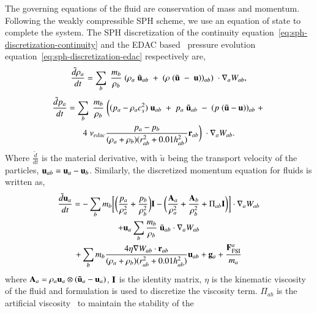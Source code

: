 The governing equations of the fluid are conservation of mass and momentum.
Following the weakly compressible SPH scheme, we use an equation of state to
complete the system. The SPH discretization of the continuity
equation~\eqref{eq:sph-discretization-continuity} and the EDAC
based~ pressure evolution
equation~\eqref{eq:sph-discretization-edac} respectively are,
\begin{equation}
  \label{eq:sph-discretization-continuity}
  \frac{\tilde{d}\rho_a}{dt} = \sum_{b} \; \frac{m_b}{\rho_{b}} \; (
  \rho_{a} \; \tilde{\mathbf{u}}_{ab} \; + \;
  (\rho \; (\tilde{\mathbf{u}} \; - \;
  \mathbf{u}))_{ab}) \; \cdot \nabla_{a} W_{ab},
\end{equation}
\begin{multline}
  \label{eq:sph-discretization-edac}
  \frac{\tilde{d}p_a}{dt} = \sum_{b} \; \frac{m_b}{\rho_{b}} \; \bigg(
  (p_{a} - \rho_{a} c_{s}^2) \; \mathbf{u}_{ab} \; + \;
  p_{a} \; \tilde{\mathbf{u}}_{ab} \; - \;
  (p \; (\tilde{\mathbf{u}} - \mathbf{u}))_{ab} \; + \; \\
  4 \; \nu_{edac}
  \frac{p_a - p_b}{(\rho_a + \rho_b) (r^2_{ab} + 0.01 h_{ab}^{2})} \mathbf{r}_{ab}
  \bigg) \; \cdot \nabla_{a} W_{ab}.
\end{multline}
%
Where $\frac{\tilde{d}}{dt}$ is the material derivative, with $\tilde{u}$ being
the transport velocity of the particles, $\mathbf{u}_{ab} = \mathbf{u}_a - \mathbf{u}_b$.
%
Similarly, the discretized momentum equation for fluids is written as,
\begin{multline}
  \label{eq:sph-momentum-fluid}
  \frac{\tilde{d}\mathbf{u}_{a}}{dt} = - \sum_{b} m_b \bigg[
  \bigg(\frac{p_a}{\rho_a^2} + \frac{p_b}{\rho_b^2}\bigg) \mathbf{I} -
  \bigg(\frac{\mathbf{A}_a}{\rho_a^2} + \frac{\mathbf{A}_b}{\rho_b^2} + \Pi_{ab}
  \mathbf{I} \bigg) \bigg]
  \cdot \nabla_{a} W_{ab} \\
  + \mathbf{u}_{a} \sum_{b} \frac{m_b}{\rho_{b}} \; \tilde{\mathbf{u}}_{ab} \cdot
  \nabla_{a} W_{ab} \\+ \sum_{b} m_b \frac{4 \eta \nabla W_{ab}\cdot
    \mathbf{r}_{ab}}{(\rho_a + \rho_b) (r_{ab}^2 + 0.01 h_{ab}^2)} \mathbf{u}_{ab} +
  \mathbf{g}_{a} + \frac{\mathbf{F}^a_{\text{FSI}}}{m_a}
\end{multline}
where $\mathbf{A}_a = \rho_a \mathbf{u}_a \otimes (\mathbf{\tilde{u}}_a - \mathbf{u}_a)$,
$\mathbf{I}$ is the identity matrix, $\eta$ is the kinematic viscosity of the
fluid and \citep{morris-lowRe-97} formulation is used to discretize the
viscosity term. $\Pi_{ab}$ is the artificial
viscosity~\citep{monaghan-review:2005} to maintain the stability of the
